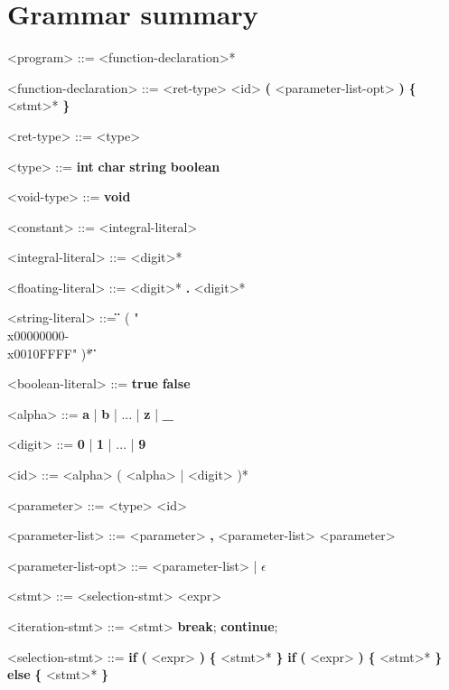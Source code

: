 \documentclass{article}
\begin{document}
	\section{Grammar summary}
		\itshape
		\setlength{\grammarindent}{12em}

		\begin{grammar}
			<program> ::= <function-declaration>*
			
			<function-declaration> ::= <ret-type> <id> \textbf{(} <parameter-list-opt> \textbf{)} \textbf{\{} <stmt>* \textbf{\}}

			<ret-type> ::= <type>
			\alt <void-type>
			
			<type> ::= \textbf{int}
			\alt \textbf{char}
			\alt \textbf{string}
			\alt \textbf{boolean}
			
			<void-type> ::= \textbf{void}
						
			<constant> ::= <integral-literal>
			\alt <floating-literal>
			\alt <string-literal>
			\alt <boolean-literal>
			
			<integral-literal> ::= <digit>*
			
			<floating-literal> ::= <digit>* \textbf{.} <digit>*
			
			<string-literal> ::= \textbf{\"} ( "\\x00000000-\\x0010FFFF" )*  \textbf{\"}
			
			<boolean-literal> ::= \textbf{true}
			\alt \textbf{false}
			
			<alpha> ::= \textbf{a} | \textbf{b} | ... | \textbf{z} | \textbf{_}

			<digit> ::= \textbf{0} | \textbf{1} | ... | \textbf{9}

	
			<id> ::= <alpha> ( <alpha> | <digit> )*
			
			<parameter> ::= <type> <id>
			
			<parameter-list> ::= <parameter> \textbf{,} <parameter-list>
			\alt <parameter>
			
			<parameter-list-opt> ::= <parameter-list> | $\epsilon$
			
			<stmt> ::= <selection-stmt>
			\alt <iteration-stmt>
			\alt <jump-stmt>
			\alt <expr>
			
			<iteration-stmt> ::= <stmt>
			\alt \textbf{break};
			\alt \textbf{continue};
			
			<selection-stmt> ::= \textbf{if} \textbf{(} <expr> \textbf{)} \textbf{\{} <stmt>* \textbf{\}}
			\alt \textbf{if} \textbf{(} <expr> \textbf{)} \textbf{\{} <stmt>* \textbf{\}} \textbf{else} \textbf{\{} <stmt>* \textbf{\}}
			

\end{grammar}
\end{document}
